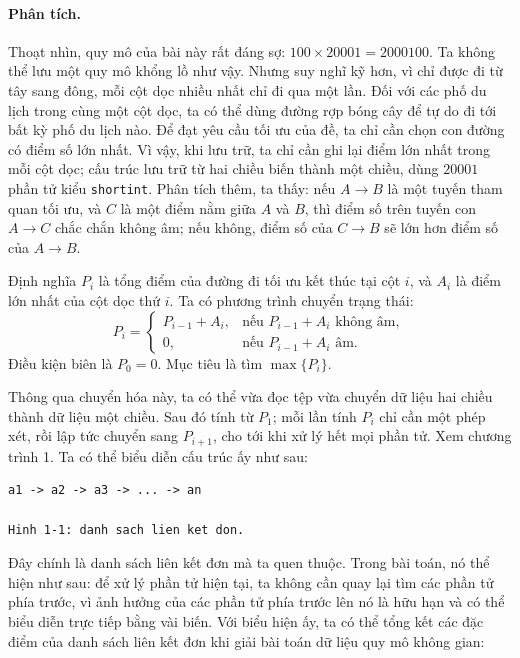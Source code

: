\documentclass[11pt]{article}
\begin{document}
\paragraph{Phân tích.}
Thoạt nhìn, quy mô của bài này rất đáng sợ:
\(100\times 20001=2000100\). Ta không thể lưu một quy mô khổng lồ như vậy.
Nhưng suy nghĩ kỹ hơn, vì chỉ được đi từ tây sang đông, mỗi cột dọc nhiều
nhất chỉ đi qua một lần. Đối với các phố du lịch trong cùng một cột dọc, ta
có thể dùng đường rợp bóng cây để tự do đi tới bất kỳ phố du lịch nào. Để đạt
yêu cầu tối ưu của đề, ta chỉ cần chọn con đường có điểm số lớn nhất. Vì vậy,
khi lưu trữ, ta chỉ cần ghi lại điểm lớn nhất trong mỗi cột dọc; cấu trúc lưu
trữ từ hai chiều biến thành một chiều, dùng \(20001\) phần tử kiểu
\texttt{shortint}. Phân tích thêm, ta thấy: nếu \(A\to B\) là một tuyến tham
quan tối ưu, và \(C\) là một điểm nằm giữa \(A\) và \(B\), thì điểm số trên
tuyến con \(A\to C\) chắc chắn không âm; nếu không, điểm số của \(C\to B\)
sẽ lớn hơn điểm số của \(A\to B\).

Định nghĩa \(P_i\) là tổng điểm của đường đi tối ưu kết thúc tại cột \(i\),
và \(A_i\) là điểm lớn nhất của cột dọc thứ \(i\). Ta có phương trình chuyển
trạng thái:
\[
P_i=
\begin{cases}
P_{i-1}+A_i, & \text{nếu } P_{i-1}+A_i \text{ không âm},\\
0, & \text{nếu } P_{i-1}+A_i \text{ âm}.
\end{cases}
\]
Điều kiện biên là \(P_0=0\). Mục tiêu là tìm \(\max\{P_i\}\).

Thông qua chuyển hóa này, ta có thể vừa đọc tệp vừa chuyển dữ liệu hai chiều
thành dữ liệu một chiều. Sau đó tính từ \(P_1\); mỗi lần tính \(P_i\) chỉ cần
một phép xét, rồi lập tức chuyển sang \(P_{i+1}\), cho tới khi xử lý hết mọi
phần tử. Xem chương trình 1. Ta có thể biểu diễn cấu trúc ấy như sau:

\begin{verbatim}
a1 -> a2 -> a3 -> ... -> an

Hinh 1-1: danh sach lien ket don.
\end{verbatim}

Đây chính là danh sách liên kết đơn mà ta quen thuộc. Trong bài toán, nó thể
hiện như sau: để xử lý phần tử hiện tại, ta không cần quay lại tìm các phần
tử phía trước, vì ảnh hưởng của các phần tử phía trước lên nó là hữu hạn và
có thể biểu diễn trực tiếp bằng vài biến. Với biểu hiện ấy, ta có thể tổng
kết các đặc điểm của danh sách liên kết đơn khi giải bài toán dữ liệu quy mô
không gian:
\end{document}
